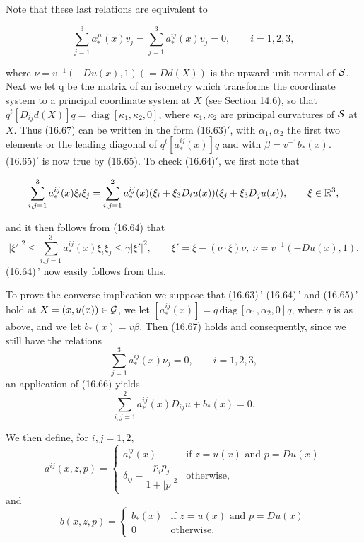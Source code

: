 Note that these last relations are equivalent to

\[
\sum_{j=1}^3 a_*^{ji}(x)v_j=\sum_{j=1}^3 a_*^{ij}(x)v_j=0,\qquad i=1,2,3,
\]

where $\nu=v^{-1}(-Du(x),1)(=Dd(X))$ is the upward unit normal of $\mathcal{S}$. Next we let q
be the matrix of an isometry which transforms the coordinate system to a principal
coordinate system at $X$ (see Section 14.6), so that
$q^t[D_{ij}d(X)]q=\operatorname{diag}[\kappa_1,\kappa_2,0]$,
where $\kappa_1,\kappa_2$ are principal curvatures of $\mathcal{S}$ at $X$. Thus (16.67) can be written in the
form (16.63)${}'$, with $\alpha_1,\alpha_2$ the first two elements or the leading diagonal of
$q^t[a_*^{ij}(x)]q$
and with $\beta=v^{-1}b_*(x)$. (16.65)${}'$ is now true by (16.65). To check (16.64)${}'$, we first
note that

\[
\sum_{i,j=1}^3 a_*^{ij}(x)\xi_i\xi_j=\sum_{i,j=1}^2 a_*^{ij}(x)(\xi_i+\xi_3D_i u(x))(\xi_j+\xi_3D_j u(x)),\qquad \xi\in \mathbb{R}^3,
\]



and it then follows from (16.64) that
\[
|\xi'|^2 \le \sum_{i,j=1}^3 a_*^{ij}(x)\xi_i\xi_j \le \gamma|\xi'|^2, \qquad \xi' = \xi - (\nu\cdot \xi)\nu,\ \nu = v^{-1}(-Du(x),1).
\]
(16.64)\,' now easily follows from this.

To prove the converse implication we suppose that (16.63)\,' (16.64)\,' and (16.65)\,' hold at $X=(x,u(x))\in\mathcal{G}$, we let $[a_*^{ij}(x)] = q\,\mathrm{diag}\,[\alpha_1,\alpha_2,0]q$, where $q$ is as above, and we let $b_*(x)=v\beta$. Then (16.67) holds and consequently, since we still have the relations
\[
\sum_{j=1}^3 a_*^{ij}(x)\nu_j=0, \qquad i=1,2,3,
\]
an application of (16.66) yields
\[
\sum_{i,j=1}^2 a_*^{ij}(x)D_{ij}u+b_*(x)=0.
\]

We then define, for $i,j=1,2$,
\[
a^{ij}(x,z,p)=\begin{cases}
 a_*^{ij}(x) & \text{if } z=u(x)\text{ and }p=Du(x)\\
 \delta_{ij}-\dfrac{p_ip_j}{1+|p|^2} & \text{otherwise,}
\end{cases}
\]
and
\[
b(x,z,p)=\begin{cases}
 b_*(x) & \text{if } z=u(x)\text{ and }p=Du(x)\\
 0 & \text{otherwise.}
\end{cases}
\]

